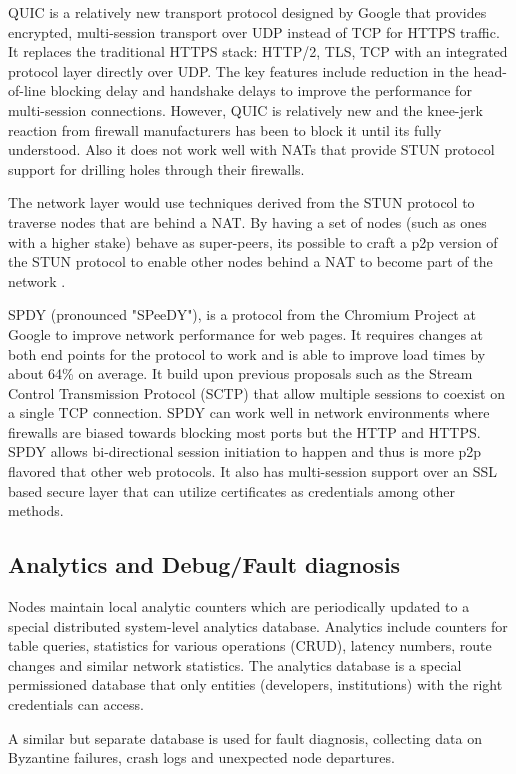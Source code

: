 QUIC is a relatively new transport protocol designed by Google \cite{quic_sigcomm} that provides encrypted, multi-session transport over UDP
instead of TCP for HTTPS traffic. It replaces the traditional HTTPS stack: HTTP/2, TLS, TCP with an integrated protocol
layer directly over UDP. The key features include reduction in the head-of-line blocking delay and handshake delays to
improve the performance for multi-session connections. However, QUIC is relatively new and the knee-jerk reaction from
firewall manufacturers has been to block it until its fully understood. Also it does not work well with NATs that
provide STUN protocol \cite{stun_protocol} support for drilling holes through their firewalls.  

The network layer would use techniques derived from the STUN protocol to traverse nodes
that are behind a NAT. By having a set of nodes (such as ones with a higher stake) behave as
super-peers, its possible to craft a p2p version of the STUN protocol to enable
other nodes behind a NAT to become part of the network \cite{p2p_nat}.

SPDY (pronounced "SPeeDY"), is a protocol from the Chromium Project at Google \cite{speedy_protocol} to improve network performance for web
pages. It requires changes at both end points for the protocol to work and is able to improve load times by about 64\%
on average. It build upon previous proposals such as the Stream Control Transmission Protocol (SCTP) \cite{sctp}
\cite{sctp_rfc} that allow multiple sessions to coexist on a single TCP connection. SPDY can work well in network
environments where firewalls are biased towards blocking most ports but the HTTP and HTTPS. SPDY allows bi-directional
session initiation to happen and thus is more p2p flavored that other web protocols. It also has multi-session support
over an SSL based secure layer that can utilize certificates as credentials among other methods.


\subsection{Analytics and Debug/Fault diagnosis}
\label{net:analytics}

Nodes maintain local analytic counters which are periodically updated to a special distributed system-level analytics
database. Analytics include counters for table queries, statistics for various operations (CRUD), latency numbers, route
changes and similar network statistics. The analytics database is a special permissioned database that only entities
(developers, institutions) with the right credentials can access.

A similar but separate database is used for fault diagnosis, collecting data on Byzantine failures, crash logs and
unexpected node departures. 
